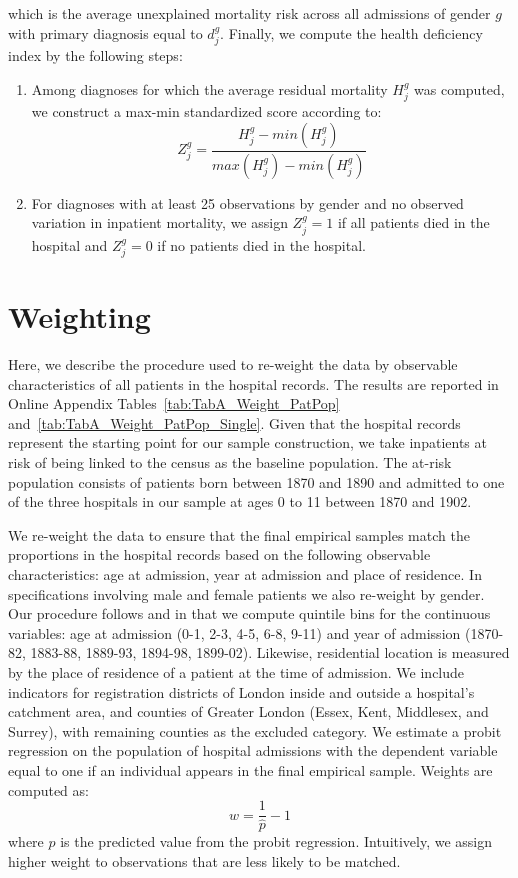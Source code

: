 \documentclass[12pt,english]{article}
\begin{document}
\noindent which is the average unexplained mortality risk across all admissions of gender $g$ with primary diagnosis equal to $d_{j}^g$. Finally, we compute the health deficiency index by the following steps:

\begin{enumerate}
	\item Among diagnoses for which the average residual mortality $H_{j}^g$ was computed, we construct a max-min standardized score according to:
	\[
		Z_j^g = \frac{H_j^g - min(H_j^g)}{max(H_j^g) - min(H_j^g)}
	\]
	\item For diagnoses with at least 25 observations by gender and no observed variation in inpatient mortality, we assign $Z_j^g = 1$ if all patients died in the hospital and $Z_j^g = 0$ if no patients died in the hospital.
\end{enumerate}

\section{Weighting\label{sec:weighting}}

Here, we describe the procedure used to re-weight the data by observable characteristics of all patients in the hospital records. The results are reported in Online Appendix Tables~\ref{tab:TabA_Weight_PatPop} and~\ref{tab:TabA_Weight_PatPop_Single}. Given that the hospital records represent the starting point for our sample construction, we take inpatients at risk of being linked to the census as the baseline population. The at-risk population consists of patients born between 1870 and 1890 and admitted to one of the three hospitals in our sample at ages 0 to 11 between 1870 and 1902. 

We re-weight the data to ensure that the final empirical samples match the proportions in the hospital records based on the following observable characteristics: age at admission, year at admission and place of residence. In specifications involving male and female patients we also re-weight by gender. Our procedure follows \cite{Abramitzky-etal2021} and \cite{Black2020} in that we compute quintile bins for the continuous variables: age at admission (0-1, 2-3, 4-5, 6-8, 9-11) and year of admission (1870-82, 1883-88, 1889-93, 1894-98, 1899-02). Likewise, residential location is measured by the place of residence of a patient at the time of admission. We include indicators for registration districts of London inside and outside a hospital's catchment area, and counties of Greater London (Essex, Kent, Middlesex, and Surrey), with remaining counties as the excluded category. We estimate a probit regression on the population of hospital admissions with the dependent variable equal to one if an individual appears in the final empirical sample. Weights are computed as: $$w=\frac{1}{\widehat{p}}-1$$ where $\widehat{p}$ is the predicted value from the probit regression. Intuitively, we assign higher weight to observations that are less likely to be matched.
\end{document}
